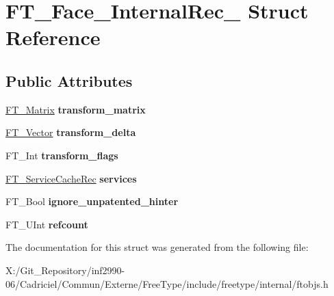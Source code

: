 \hypertarget{struct_f_t___face___internal_rec__}{\section{F\-T\-\_\-\-Face\-\_\-\-Internal\-Rec\-\_\- Struct Reference}
\label{struct_f_t___face___internal_rec__}
}
\subsection*{Public Attributes}
\begin{DoxyCompactItemize}
\item 
\hypertarget{struct_f_t___face___internal_rec___ab4be2dcda098e6136f5701580d18032d}{\hyperlink{struct_f_t___matrix__}{F\-T\-\_\-\-Matrix} {\bfseries transform\-\_\-matrix}}\label{struct_f_t___face___internal_rec___ab4be2dcda098e6136f5701580d18032d}

\item 
\hypertarget{struct_f_t___face___internal_rec___ab6c2aacdac58312273395b21b8d168c6}{\hyperlink{struct_f_t___vector__}{F\-T\-\_\-\-Vector} {\bfseries transform\-\_\-delta}}\label{struct_f_t___face___internal_rec___ab6c2aacdac58312273395b21b8d168c6}

\item 
\hypertarget{struct_f_t___face___internal_rec___a2495aced35040e1b7c2bc0afcd7a920d}{F\-T\-\_\-\-Int {\bfseries transform\-\_\-flags}}\label{struct_f_t___face___internal_rec___a2495aced35040e1b7c2bc0afcd7a920d}

\item 
\hypertarget{struct_f_t___face___internal_rec___abc3acb3bf5db056bb9c549af04f07963}{\hyperlink{struct_f_t___service_cache_rec__}{F\-T\-\_\-\-Service\-Cache\-Rec} {\bfseries services}}\label{struct_f_t___face___internal_rec___abc3acb3bf5db056bb9c549af04f07963}

\item 
\hypertarget{struct_f_t___face___internal_rec___af898fd754c36c3f34c9ce0e88eb101c9}{F\-T\-\_\-\-Bool {\bfseries ignore\-\_\-unpatented\-\_\-hinter}}\label{struct_f_t___face___internal_rec___af898fd754c36c3f34c9ce0e88eb101c9}

\item 
\hypertarget{struct_f_t___face___internal_rec___a05d49c857c024a50441e17899803f56c}{F\-T\-\_\-\-U\-Int {\bfseries refcount}}\label{struct_f_t___face___internal_rec___a05d49c857c024a50441e17899803f56c}

\end{DoxyCompactItemize}


The documentation for this struct was generated from the following file\-:\begin{DoxyCompactItemize}
\item 
X\-:/\-Git\-\_\-\-Repository/inf2990-\/06/\-Cadriciel/\-Commun/\-Externe/\-Free\-Type/include/freetype/internal/ftobjs.\-h\end{DoxyCompactItemize}
